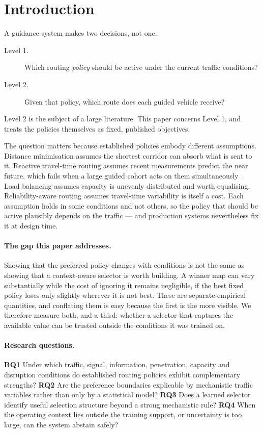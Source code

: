 \section{Introduction}

A guidance system makes two decisions, not one.

\begin{description}
\item[Level 1.] Which routing \emph{policy} should be active under the current
traffic conditions?
\item[Level 2.] Given that policy, which route does each guided vehicle
receive?
\end{description}

Level 2 is the subject of a large literature. This paper concerns Level 1, and
treats the policies themselves as fixed, published objectives.

The question matters because established policies embody different assumptions.
Distance minimisation assumes the shortest corridor can absorb what is sent to
it. Reactive travel-time routing assumes recent measurements predict the near
future, which fails when a large guided cohort acts on them
simultaneously~\cite{arnott1991information,acemoglu2018braess}. Load balancing
assumes capacity is unevenly distributed and worth equalising. Reliability-aware
routing assumes travel-time variability is itself a cost. Each assumption holds
in some conditions and not others, so the policy that should be active plausibly
depends on the traffic --- and production systems nevertheless fix it at design
time.

\paragraph{The gap this paper addresses.}
Showing that the preferred policy changes with conditions is not the same as
showing that a context-aware selector is worth building. A winner map can vary
substantially while the cost of ignoring it remains negligible, if the best
fixed policy loses only slightly wherever it is not best. These are separate
empirical quantities, and conflating them is easy because the first is the more
visible. We therefore measure both, and a third: whether a selector that
captures the available value can be trusted outside the conditions it was
trained on.

\paragraph{Research questions.}
\textbf{RQ1} Under which traffic, signal, information, penetration, capacity and
disruption conditions do established routing policies exhibit complementary
strengths?
\textbf{RQ2} Are the preference boundaries explicable by mechanistic traffic
variables rather than only by a statistical model?
\textbf{RQ3} Does a learned selector identify useful selection structure beyond
a strong mechanistic rule?
\textbf{RQ4} When the operating context lies outside the training support, or
uncertainty is too large, can the system abstain safely?

